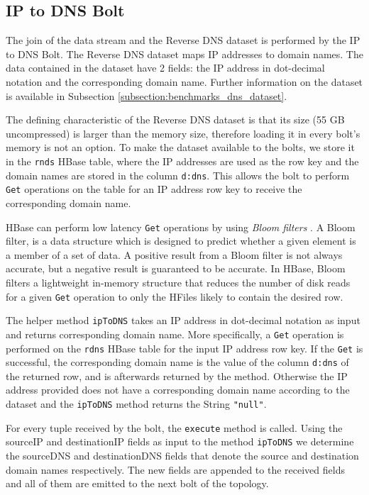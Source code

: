 \subsection{IP to DNS Bolt}

The join of the data stream and the Reverse DNS dataset is performed by the IP to DNS Bolt. The Reverse DNS dataset maps IP addresses to domain names. The data contained in the dataset have 2 fields: the IP address in dot-decimal notation and the corresponding domain name. Further information on the dataset is available in Subsection \ref{subsection:benchmarks_dns_dataset}.

The defining characteristic of the Reverse DNS dataset is that its size (55 GB uncompressed) is larger than the memory size, therefore loading it in every bolt's memory is not an option. To make the dataset available to the bolts, we store it in the \texttt{rnds} HBase table, where the IP addresses are used as the row key and the domain names are stored in the column \texttt{d:dns}. This allows the bolt to perform \texttt{Get} operations on the table for an IP address row key to receive the corresponding domain name.

HBase can perform low latency \texttt{Get} operations by using \emph{Bloom filters} \cite{bloom}. A Bloom filter, is a data structure which is designed to predict whether a given element is a member of a set of data. A positive result from a Bloom filter is not always accurate, but a negative result is guaranteed to be accurate. In HBase, Bloom filters a lightweight in-memory structure that reduces the number of disk reads for a given \texttt{Get} operation to only the HFiles likely to contain the desired row.

The helper method \texttt{ipToDNS} takes an IP address in dot-decimal notation as input and returns corresponding domain name. More specifically, a \texttt{Get} operation is performed on the \texttt{rdns} HBase table for the input IP address row key. If the \texttt{Get} is successful, the corresponding domain name is the value of the column \texttt{d:dns} of the returned row, and is afterwards returned by the method. Otherwise the IP address provided does not have a corresponding domain name according to the dataset and the \texttt{ipToDNS} method returns the String \texttt{"null"}.

For every tuple received by the bolt, the \texttt{execute} method is called. Using the sourceIP and destinationIP fields as input to the method \texttt{ipToDNS} we determine the sourceDNS and destinationDNS fields that denote the source and destination domain names respectively. The new fields are appended to the received fields and all of them are emitted to the next bolt of the topology.

